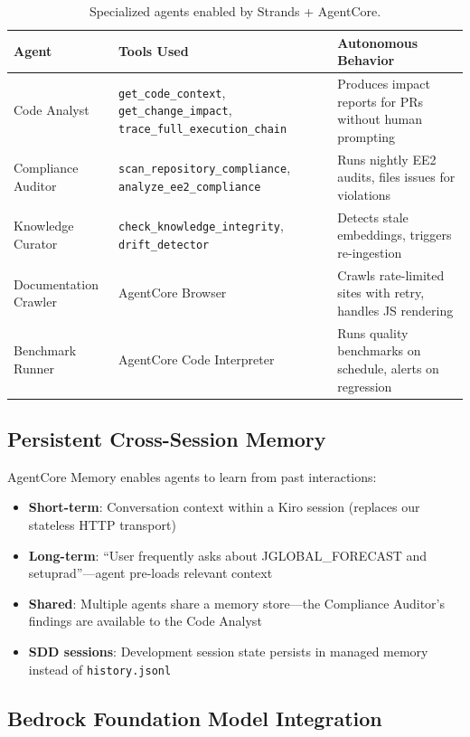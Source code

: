 \documentclass[11pt,letterpaper]{article}
\begin{document}
\begin{table}[H]
\centering
\footnotesize
\begin{tabular}{@{}p{3cm}p{4cm}p{6cm}@{}}
\toprule
\textbf{Agent} & \textbf{Tools Used} & \textbf{Autonomous Behavior} \\
\midrule
Code Analyst & \texttt{get\_code\_context}, \texttt{get\_change\_impact}, \texttt{trace\_full\_execution\_chain} & Produces impact reports for PRs without human prompting \\
Compliance Auditor & \texttt{scan\_repository\_compliance}, \texttt{analyze\_ee2\_compliance} & Runs nightly EE2 audits, files issues for violations \\
Knowledge Curator & \texttt{check\_knowledge\_integrity}, \texttt{drift\_detector} & Detects stale embeddings, triggers re-ingestion \\
Documentation Crawler & AgentCore Browser & Crawls rate-limited sites with retry, handles JS rendering \\
Benchmark Runner & AgentCore Code Interpreter & Runs quality benchmarks on schedule, alerts on regression \\
\bottomrule
\end{tabular}
\caption{Specialized agents enabled by Strands + AgentCore.}
\end{table}

\subsection{Persistent Cross-Session Memory}

AgentCore Memory enables agents to learn from past interactions:

\begin{itemize}[noitemsep]
    \item \textbf{Short-term}: Conversation context within a Kiro session
          (replaces our stateless HTTP transport)
    \item \textbf{Long-term}: ``User frequently asks about JGLOBAL\_FORECAST
          and setuprad''---agent pre-loads relevant context
    \item \textbf{Shared}: Multiple agents share a memory store---the
          Compliance Auditor's findings are available to the Code Analyst
    \item \textbf{SDD sessions}: Development session state persists in
          managed memory instead of \texttt{history.jsonl}
\end{itemize}

\subsection{Bedrock Foundation Model Integration}
\end{document}
